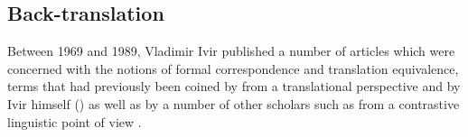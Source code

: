 \subsection{Back-translation}
\label{sec:2.3.2}  
Between 1969 and 1989, Vladimir Ivir published a number of articles \citep{ivir_contrasting_1969, ivir_remarks_1970, ivir_formal_1981, ivir_translation-based_1983, dirven_functionalism_1987, radovanovi_translation_1989} which were concerned with the notions of formal correspondence and translation equivalence, terms that had previously been coined by \citet{catford_linguistic_1965} from a translational perspective and by Ivir himself (\citeyear{ivir_contrasting_1969, ivir_remarks_1970}) as well as by a number of other scholars such as \citet{nickel_equivalence_1971, nickel_kontrastive_1972} from a contrastive linguistic point of view \citep[51]{ivir_formal_1981}.

